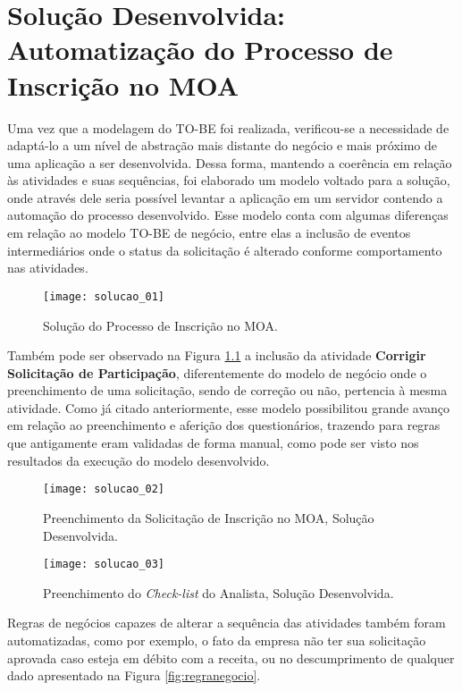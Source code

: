 \chapter[Solução Desenvolvida: Automatização do Processo de Inscrição no MOA]{Solução Desenvolvida: Automatização do Processo de Inscrição no MOA}
\label{chap:solucao}
	Uma vez que a modelagem do TO-BE foi realizada, verificou-se a necessidade de adaptá-lo a um nível de abstração mais distante do negócio e mais próximo de uma aplicação a ser desenvolvida. Dessa forma, mantendo a coerência em relação às atividades e suas sequências, foi elaborado um modelo voltado para a solução, onde através dele seria possível levantar a aplicação em um servidor contendo a automação do processo desenvolvido. Esse modelo conta com algumas diferenças em relação ao modelo TO-BE de negócio, entre elas a inclusão de eventos intermediários onde o status da solicitação é alterado conforme comportamento nas atividades.
	\begin{figure}[H]
		\centering
		\texttt{[image: solucao\_01]}
		\caption[Solução do Processo de Inscrição no MOA]{Solução do Processo de Inscrição no MOA.}
		\label{fig:solprocesso}
	\end{figure}
	Também pode ser observado na Figura \ref{fig:solprocesso} a inclusão da atividade \textbf{Corrigir Solicitação de Participação}, diferentemente do modelo de negócio onde o preenchimento de uma solicitação, sendo de correção ou não, pertencia à mesma atividade. Como já citado anteriormente, esse modelo possibilitou grande avanço em relação ao preenchimento e aferição dos questionários, trazendo para regras que antigamente eram validadas de forma manual, como pode ser visto nos resultados da execução do modelo desenvolvido.
	\begin{figure}[H]
		\centering
		\texttt{[image: solucao\_02]}
		\caption[Preenchimento da Solicitação de Inscrição no MOA, Solução Desenvolvida]{Preenchimento da Solicitação de Inscrição no MOA, Solução Desenvolvida.}
		\label{fig:solinscricaoimagem}
	\end{figure}
	\begin{figure}[H]
		\centering
		\texttt{[image: solucao\_03]}
		\caption[Preenchimento do \emph{Check-list} do Analista, Solução Desenvolvida]{Preenchimento do \emph{Check-list} do Analista, Solução Desenvolvida.}
		\label{fig:solchecklistimagem}
	\end{figure}
	Regras de negócios capazes de alterar a sequência das atividades também foram automatizadas, como por exemplo, o fato da empresa não ter sua solicitação aprovada caso esteja em débito com a receita, ou no descumprimento de qualquer dado apresentado na Figura \ref{fig:regranegocio}.
